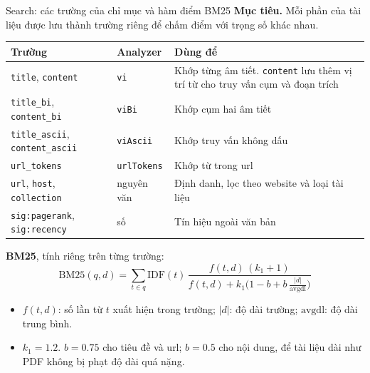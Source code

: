 \documentclass[aspectratio=169,t,10pt]{beamer}
\newcommand{\code}[1]{\texttt{#1}}
\newcommand{\muctieu}[1]{\noindent\textbf{Mục tiêu.} #1\par\vspace{4pt}}
\begin{document}
\begin{frame}[shrink]{Search: các trường của chỉ mục và hàm điểm BM25}
\small
\muctieu{Mỗi phần của tài liệu được lưu thành trường riêng để chấm điểm với trọng số khác nhau.}
\footnotesize
\renewcommand{\arraystretch}{1.22}
\begin{tabularx}{\textwidth}{@{}P{3.4cm}P{1.9cm}Y@{}}
\toprule
\textbf{Trường} & \textbf{Analyzer} & \textbf{Dùng để}\\
\midrule
\code{title}, \code{content} & \code{vi} & Khớp từng âm tiết. \code{content} lưu thêm vị trí từ cho truy vấn cụm và đoạn trích\\
\code{title\_bi}, \code{content\_bi} & \code{viBi} & Khớp cụm hai âm tiết\\
\code{title\_ascii}, \code{content\_ascii} & \code{viAscii} & Khớp truy vấn không dấu\\
\code{url\_tokens} & \code{urlTokens} & Khớp từ trong url\\
\code{url}, \code{host}, \code{collection} & nguyên văn & Định danh, lọc theo website và loại tài liệu\\
\code{sig:pagerank}, \code{sig:recency} & số & Tín hiệu ngoài văn bản\\
\bottomrule
\end{tabularx}
\small
\vspace{4pt}
\textbf{BM25}, tính riêng trên từng trường:
$$\mathrm{BM25}(q,d)=\sum_{t\in q}\mathrm{IDF}(t)\,\frac{f(t,d)\,(k_1+1)}{f(t,d)+k_1\big(1-b+b\,\frac{|d|}{\mathrm{avgdl}}\big)}$$
\begin{itemize}
  \item $f(t,d)$: số lần từ $t$ xuất hiện trong trường; $|d|$: độ dài trường; $\mathrm{avgdl}$: độ dài trung bình.
  \item $k_1 = 1.2$. $b = 0.75$ cho tiêu đề và url; $b = 0.5$ cho nội dung, để tài liệu dài như PDF không bị phạt độ dài quá nặng.
\end{itemize}
\end{frame}
\end{document}
